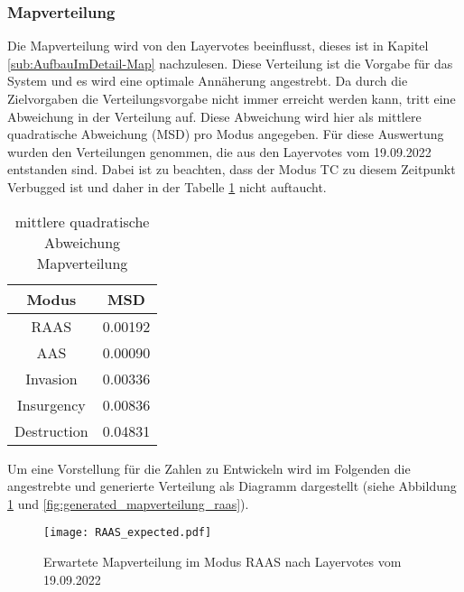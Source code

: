         \subsubsection{Mapverteilung}
            Die Mapverteilung wird von den Layervotes beeinflusst, dieses ist in Kapitel \ref{sub:AufbauImDetail-Map} nachzulesen.
            Diese Verteilung ist die Vorgabe für das System und es wird eine optimale Annäherung angestrebt. Da durch die 
            Zielvorgaben die Verteilungsvorgabe nicht immer erreicht werden kann, tritt eine Abweichung in der Verteilung auf.
            Diese Abweichung wird hier als mittlere quadratische Abweichung (MSD) pro Modus angegeben.
            Für diese Auswertung wurden den Verteilungen genommen, die aus den Layervotes vom 19.09.2022 entstanden sind.
            Dabei ist zu beachten, dass der Modus TC zu diesem Zeitpunkt \glqq{}Verbugged\grqq{} ist und daher 
            in der Tabelle \ref{t:Ergebnisse:fehler_Mapverteilung} nicht auftaucht.\\
            \begin{table}[h]
                \centering
                \begin{tabular}{|| c c ||}
                    \hline
                    Modus & MSD \\
                    \hline
                    \hline
                    RAAS & 0.00192 \\
                    \hline
                    AAS & 0.00090 \\
                    \hline
                    Invasion & 0.00336 \\
                    \hline
                    Insurgency & 0.00836 \\
                    \hline
                    Destruction & 0.04831 \\
                    \hline
                \end{tabular}
                \caption{mittlere quadratische Abweichung Mapverteilung}
                \label{t:Ergebnisse:fehler_Mapverteilung}
            \end{table}
            
            Um eine Vorstellung für die Zahlen zu Entwickeln wird im Folgenden die angestrebte und generierte Verteilung als 
            Diagramm dargestellt (siehe Abbildung \ref{fig:expected_mapverteilung_raas} 
            und \ref{fig:generated_mapverteilung_raas}).

            \begin{figure}[htbp]
                \centering
                \texttt{[image: RAAS\_expected.pdf]}
                \caption{Erwartete Mapverteilung im Modus RAAS nach Layervotes vom 19.09.2022}
                \label{fig:expected_mapverteilung_raas}
            \end{figure}

